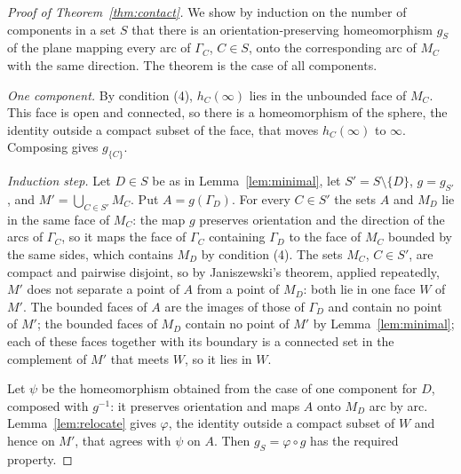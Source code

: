 \documentclass[11pt,a4paper]{article}
\theoremstyle{definition}
\theoremstyle{remark}
\begin{document}
\begin{proof}[Proof of Theorem~\ref{thm:contact}]
We show by induction on the number of components in a set $S$ that there is
an orientation-preserving homeomorphism $g_S$ of the plane mapping every arc
of $\Gamma_C$, $C\in S$, onto the corresponding arc of $M_C$ with the same
direction. The theorem is the case of all components.

\emph{One component.} By condition (4), $h_C(\infty)$ lies in the unbounded
face of $M_C$. This face is open and connected, so there is a homeomorphism of
the sphere, the identity outside a compact subset of the face, that moves
$h_C(\infty)$ to $\infty$. Composing gives $g_{\{C\}}$.

\emph{Induction step.} Let $D\in S$ be as in Lemma~\ref{lem:minimal}, let
$S'=S\setminus\{D\}$, $g=g_{S'}$, and $M'=\bigcup_{C\in S'}M_C$. Put
$A=g(\Gamma_D)$. For every $C\in S'$ the sets $A$ and $M_D$ lie in the same
face of $M_C$: the map $g$ preserves orientation and the direction of the
arcs of $\Gamma_C$, so it maps the face of $\Gamma_C$ containing $\Gamma_D$ to
the face of $M_C$ bounded by the same sides, which contains $M_D$ by
condition (4). The sets $M_C$, $C\in S'$, are compact and pairwise disjoint,
so by Janiszewski's theorem, applied repeatedly, $M'$ does not separate a
point of $A$ from a point of $M_D$: both lie in one face $W$ of $M'$. The
bounded faces of $A$ are the images of those of $\Gamma_D$ and contain no
point of $M'$; the bounded faces of $M_D$ contain no point of $M'$ by
Lemma~\ref{lem:minimal}; each of these faces together with its boundary is a
connected set in the complement of $M'$ that meets $W$, so it lies in $W$.

Let $\psi$ be the homeomorphism obtained from the case of one component for
$D$, composed with $g^{-1}$: it preserves orientation and maps $A$ onto $M_D$
arc by arc. Lemma~\ref{lem:relocate} gives $\varphi$, the identity outside a
compact subset of $W$ and hence on $M'$, that agrees with $\psi$ on $A$. Then
$g_S=\varphi\circ g$ has the required property.
\end{proof}



\end{document}
